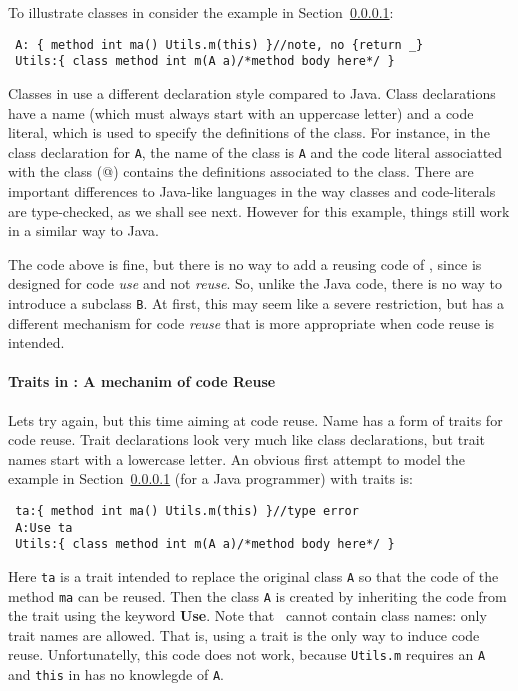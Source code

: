 To illustrate classes in \name consider the example in Section~\ref{}:

\begin{lstlisting}
 A: { method int ma() Utils.m(this) }//note, no {return _}
 Utils:{ class method int m(A a)/*method body here*/ }
\end{lstlisting} 

\noindent Classes in \name use a different declaration style compared
to Java. Class declarations have a name (which must always start with
an uppercase letter) and a code literal, which is used to specify the
definitions of the class. For instance, in the class declaration
for \lstinline{A}, the name of the class is \lstinline{A} and the code 
literal associatted with the class (@) contains the definitions associated to the
class. There are important differences to Java-like languages in the way 
classes and code-literals are type-checked, as we shall see next. 
However for this example, things still work in a similar way to Java. 

The \name code above is fine, but there is no way to add a \Q@B@ reusing code of \Q@A@, since
\Q@A@ is designed for code \emph{use} and not \emph{reuse}. So, unlike
the Java code, there is no way to introduce a subclass
\lstinline{B}. At first, this may seem like a severe restriction, but
\name has a different mechanism for code \emph{reuse} that 
is more appropriate when code reuse is intended. 

\paragraph{Traits in \name: A mechanim of code Reuse}
Lets try again, but this time aiming at code reuse. Name 
has a form of traits for code reuse. Trait declarations 
look very much like class declarations, but trait names 
start with a lowercase letter. An obvious first attempt 
to model the example in Section~\ref{} (for a Java programmer) 
with traits is:

\begin{lstlisting}
 ta:{ method int ma() Utils.m(this) }//type error
 A:Use ta
 Utils:{ class method int m(A a)/*method body here*/ }
\end{lstlisting}

\noindent Here \lstinline{ta} is a trait intended to replace the
original class \lstinline{A} so that the code of the method
\lstinline{ma} can be reused. Then the class \lstinline{A} 
is created by inheriting the code from the trait using the keyword 
{\bf Use}. Note that \use\ cannot contain class names: only trait
names are allowed.
That is, using a trait is the only way to induce code reuse.
Unfortunatelly, this code does not work, 
because \lstinline{Utils.m} requires an \lstinline{A} and \lstinline{this} in
\Q@ta@ has no knowlegde of \lstinline{A}.

